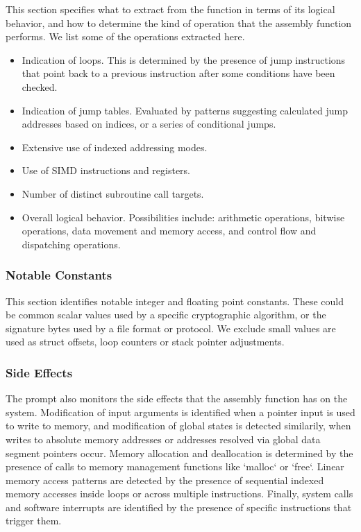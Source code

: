 \documentclass[conference,compsoc]{IEEEtran}
\begin{document}
This section specifies what to extract from the function in terms of its logical behavior, and how to determine the kind of
operation that the assembly function performs. We list some of the operations extracted here.


\begin{itemize}
\item Indication of loops. This is determined by the presence of jump instructions that point back to a previous
instruction after some conditions have been checked.
\item Indication of jump tables. Evaluated by patterns suggesting calculated jump addresses based on
indices, or a series of conditional jumps.
\item Extensive use of indexed addressing modes.
\item Use of SIMD instructions and registers.
\item Number of distinct subroutine call targets.
\item Overall logical behavior. Possibilities include: arithmetic operations, bitwise operations, data movement and memory access,
and control flow and dispatching operations.
\end{itemize}

\subsubsection{Notable Constants}

This section identifies notable integer and floating point constants.  These could be common scalar values used by
a specific cryptographic algorithm, or the signature bytes used by a file format or protocol. We exclude small
values are used as struct offsets, loop counters or stack pointer adjustments.

\subsubsection{Side Effects}

The prompt also monitors the side effects that the assembly function has on the system.
Modification of input arguments is identified when a pointer input is used to write to memory, and modification
of global states is detected similarily, when writes to absolute memory addresses or addresses resolved via global
data segment pointers occur. Memory allocation and deallocation is determined by the presence of calls to memory
management functions like `malloc` or `free`. Linear memory access patterns are detected by the presence of sequential
indexed memory accesses inside loops or across multiple instructions. Finally, system calls and software interrupts are
identified by the presence of specific instructions that trigger them.
\end{document}

